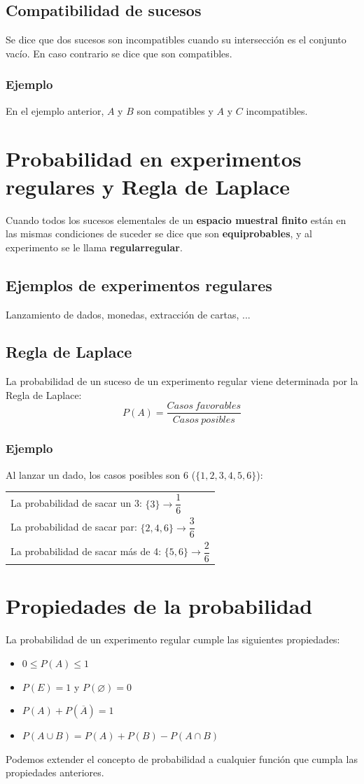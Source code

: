 \documentclass[a4paper,spanish,9pt]{extarticle}
\begin{document}
\begin{multicols*}{2}
\subsection{Compatibilidad de sucesos} Se dice que dos sucesos son incompatibles cuando su intersección es el conjunto vacío. En caso contrario se dice que son compatibles.

\subsubsection{Ejemplo} En el ejemplo anterior, $A$ y $B$ son compatibles y $A$ y $C$ incompatibles.


\section{Probabilidad en experimentos regulares y Regla de Laplace} Cuando todos los sucesos elementales de un \textbf{espacio muestral finito} están en las mismas condiciones de suceder se dice que son \textbf{equiprobables}, y al experimento se le llama \textbf{regularregular}.
\subsection{Ejemplos de experimentos regulares} Lanzamiento de dados, monedas, extracción de cartas, ...

\subsection{Regla de Laplace} La probabilidad de un suceso de un experimento regular viene determinada por la Regla de Laplace:
$$P(A)=\dfrac{Casos\ favorables}{Casos\ posibles} $$
\subsubsection{Ejemplo}
Al lanzar un dado, los casos posibles son 6 ($\lbrace1,2,3,4,5,6\rbrace$):
\begin{tabular}{l}
La probabilidad de sacar un 3: $\lbrace3\rbrace\to \dfrac{1}{6}$\\
La probabilidad de sacar par: $\lbrace2,4,6\rbrace\to\dfrac{3}{6}$ \\
La probabilidad de sacar más de 4: $\lbrace5,6\rbrace\to\dfrac{2}{6}$
\end{tabular}

\section{Propiedades de la probabilidad} La probabilidad de un experimento regular cumple las siguientes propiedades:
\begin{itemize}
\item $0 \leq P(A) \leq 1$ 
\item $P(E) = 1$ y $P(\varnothing) = 0$
\item $P(A) + P(\overline A) = 1$
\item $P(A \cup B) = P(A) + P(B) - P(A \cap B)$
\end{itemize}
Podemos extender el concepto de probabilidad a cualquier función que cumpla las propiedades anteriores.  


\end{multicols*}
\end{document}
